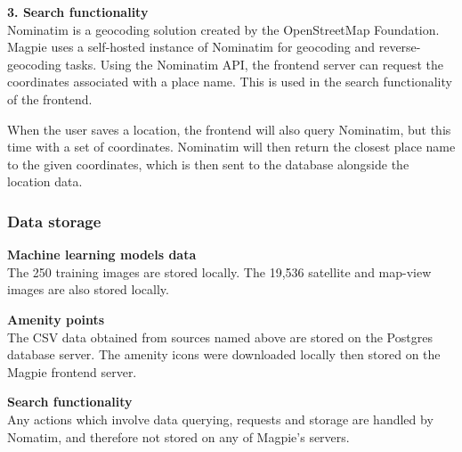 \textbf{3. Search functionality}\\
Nominatim is a geocoding solution created by the OpenStreetMap Foundation. Magpie uses a self-hosted instance of Nominatim for geocoding and reverse-geocoding tasks. Using the Nominatim API, the frontend server can request the coordinates associated with a place name. This is used in the search functionality of the frontend.

When the user saves a location, the frontend will also query Nominatim, but this
time with a set of coordinates. Nominatim will then return the closest place
name to the given coordinates, which is then sent to the database alongside the
location data.

\subsubsection{Data storage}
\textbf{Machine learning models data}\\
The 250 training images are stored locally.
The 19,536 satellite and map-view images are also stored locally.

\textbf{Amenity points}\\
The CSV data obtained from sources named above are stored on the Postgres database server.
The amenity icons were downloaded locally then stored on the Magpie frontend server.

\textbf{Search functionality}\\
Any actions which involve data querying, requests and storage are handled by Nomatim, and therefore not stored on any of Magpie's servers.
